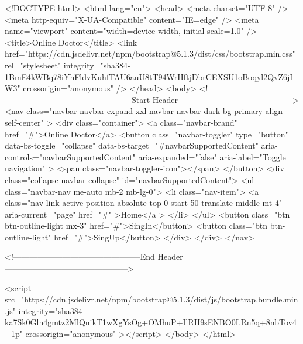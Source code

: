 <!DOCTYPE html>
<html lang="en">
  <head>
    <meta charset="UTF-8" />
    <meta http-equiv="X-UA-Compatible" content="IE=edge" />
    <meta name="viewport" content="width=device-width, initial-scale=1.0" />
    <title>Online Doctor</title>
    <link
      href="https://cdn.jsdelivr.net/npm/bootstrap@5.1.3/dist/css/bootstrap.min.css"
      rel="stylesheet"
      integrity="sha384-1BmE4kWBq78iYhFldvKuhfTAU6auU8tT94WrHftjDbrCEXSU1oBoqyl2QvZ6jIW3"
      crossorigin="anonymous"
    />
  </head>
  <body>
    <!-----------------------------------------------Start Header------------------------------------------>
    <nav
      class="navbar navbar-expand-xxl navbar navbar-dark bg-primary align-self-center"
    >
      <div class="container">
        <a class="navbar-brand" href="#">Online Doctor</a>
        <button
          class="navbar-toggler"
          type="button"
          data-bs-toggle="collapse"
          data-bs-target="#navbarSupportedContent"
          aria-controls="navbarSupportedContent"
          aria-expanded="false"
          aria-label="Toggle navigation"
        >
          <span class="navbar-toggler-icon"></span>
        </button>
        <div class="collapse navbar-collapse" id="navbarSupportedContent">
          <ul class="navbar-nav me-auto mb-2 mb-lg-0">
            <li class="nav-item">
              <a
                class="nav-link active position-absolute top-0 start-50 translate-middle mt-4"
                aria-current="page"
                href="#"
                >Home</a
              >
            </li>
          </ul>
          <button class="btn btn-outline-light mx-3" href="#">SingIn</button>
          <button class="btn btn-outline-light" href="#">SingUp</button>
        </div>
      </div>
    </nav>

    <!-----------------------------------------------End Header --------------------------------------------->

    
    <script
      src="https://cdn.jsdelivr.net/npm/bootstrap@5.1.3/dist/js/bootstrap.bundle.min.js"
      integrity="sha384-ka7Sk0Gln4gmtz2MlQnikT1wXgYsOg+OMhuP+IlRH9sENBO0LRn5q+8nbTov4+1p"
      crossorigin="anonymous"
    ></script>
  </body>
</html>
